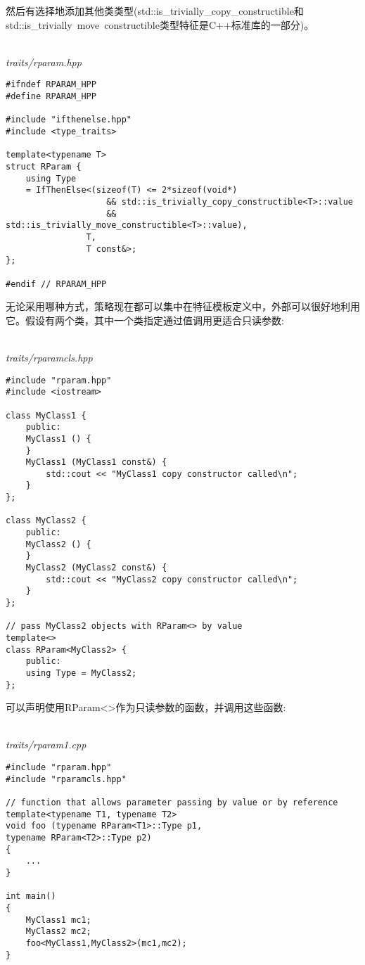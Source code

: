然后有选择地添加其他类类型(std::is\_trivially\_copy\_constructible和std::is\_trivially\ move\ constructible类型特征是C++标准库的一部分)。

\hspace*{\fill} \\ %
\noindent
\textit{traits/rparam.hpp}
\begin{lstlisting}[style=styleCXX]
#ifndef RPARAM_HPP
#define RPARAM_HPP

#include "ifthenelse.hpp"
#include <type_traits>

template<typename T>
struct RParam {
	using Type
	= IfThenElse<(sizeof(T) <= 2*sizeof(void*)
					&& std::is_trivially_copy_constructible<T>::value
					&& std::is_trivially_move_constructible<T>::value),
				T,
				T const&>;
};

#endif // RPARAM_HPP
\end{lstlisting}

无论采用哪种方式，策略现在都可以集中在特征模板定义中，外部可以很好地利用它。假设有两个类，其中一个类指定通过值调用更适合只读参数:

\hspace*{\fill} \\ %
\noindent
\textit{traits/rparamcls.hpp}
\begin{lstlisting}[style=styleCXX]
#include "rparam.hpp"
#include <iostream>

class MyClass1 {
	public:
	MyClass1 () {
	}
	MyClass1 (MyClass1 const&) {
		std::cout << "MyClass1 copy constructor called\n";
	}
};

class MyClass2 {
	public:
	MyClass2 () {
	}
	MyClass2 (MyClass2 const&) {
		std::cout << "MyClass2 copy constructor called\n";
	}
};

// pass MyClass2 objects with RParam<> by value
template<>
class RParam<MyClass2> {
	public:
	using Type = MyClass2;
};
\end{lstlisting}

可以声明使用RParam<>作为只读参数的函数，并调用这些函数:

\hspace*{\fill} \\ %
\noindent
\textit{traits/rparam1.cpp}
\begin{lstlisting}[style=styleCXX]
#include "rparam.hpp"
#include "rparamcls.hpp"

// function that allows parameter passing by value or by reference
template<typename T1, typename T2>
void foo (typename RParam<T1>::Type p1,
typename RParam<T2>::Type p2)
{
	...
}

int main()
{
	MyClass1 mc1;
	MyClass2 mc2;
	foo<MyClass1,MyClass2>(mc1,mc2);
}
\end{lstlisting}

